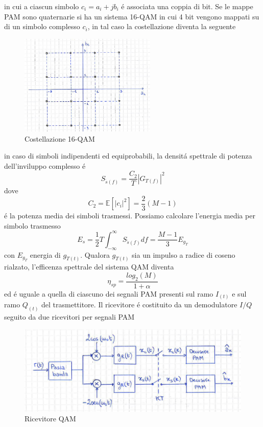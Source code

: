         in cui a ciascun simbolo $c_i = a_i +jb_i$ é associata una coppia di bit. Se le mappe PAM sono quaternarie si ha un sistema 
        16-QAM in cui 4 bit vengono mappati su di un simbolo complesso $c_i$, in tal caso la costellazione diventa la seguente
        \begin{figure}[H]
            \centering
            \includegraphics[width = 6.5cm]{media/costellazione 16qam.png}
            \caption{Costellazione 16-QAM}
        \end{figure}
        in caso di simboli indipendenti ed equiprobabili, la densitá spettrale di potenza dell'inviluppo complesso é 
        \[
            S_{\tilde{s}(f)} = \frac{C_2}{T}\left|G_{T(f)}\right|^2    
        \]
        dove 
        \[
            C_2 = \mathbb{E}[\left|c_i\right|^2] = \frac{2}{3}(M-1)    
        \]
        é la potenza media dei simboli trasmessi. Possiamo calcolare l'energia media per simbolo trasmesso
        \[
            E_s = \frac{1}{2}T\int_{-\infty}^{\infty}S_{\tilde{s}(f)} df = \frac{M-1}{3}E_{g_T}
        \]
        con $E_{g_T}$ energia di $g_{T(t)}$. Qualora $g_{T(t)}$ sia un impulso a radice di coseno rialzato, l'efficenza spettrale del 
        sistema QAM diventa 
        \[
            \eta_{sp} = \frac{log_2(M)}{1+\alpha}  
        \]
        ed é uguale a quella di ciascuno dei segnali PAM presenti sul ramo $I_{(t)}$ e sul ramo $Q_{(t)}$ del trasmettitore.
        Il ricevitore é costituito da un demodulatore $I/Q$ seguito da due ricevitori per segnali PAM
        \begin{figure}[H]
            \centering
            \includegraphics[width = 12cm]{media/ricevitore qam 2.png}
            \caption{Ricevitore QAM}
        \end{figure}
